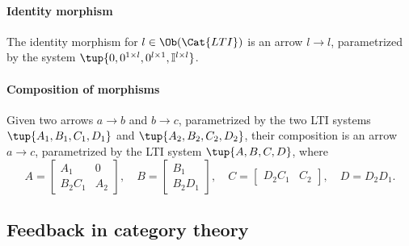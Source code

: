 \paragraph{Identity morphism}
The identity morphism for $l\in \Ob(\Cat{LTI})$ is an arrow $l\to l$, parametrized by the system $\tup{0,0^{1\times l},0^{l\times 1},\mathbb{I}^{l\times l}}$.
\paragraph{Composition of morphisms}
Given two arrows $a\to b$ and $b\to c$, parametrized by the two LTI systems $\tup{A_1,B_1,C_1,D_1}$ and $\tup{A_2,B_2,C_2,D_2}$, their composition is an arrow $a\to c$, parametrized by the LTI system $\tup{A,B,C,D}$, where
\begin{equation}
    A=\begin{bmatrix}
    A_1&0\\
    B_2C_1&A_2
    \end{bmatrix},\quad
    B=\begin{bmatrix}
    B_1\\
    B_2D_1
    \end{bmatrix},\quad 
    C=\begin{bmatrix}
    D_2C_1&C_2
    \end{bmatrix}, \quad
    D=D_2D_1.
\end{equation}
\subsection{Feedback in category theory}
\label{sec:feedbackindesign}


